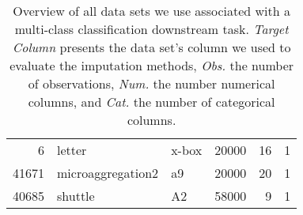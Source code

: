 \begin{table}[h!]
\begin{tabular}{rllrrr}
         6 &                                 letter &     x-box &   20000 &               16 &                1 \\
     41671 &                      microaggregation2 &    a9 &    20000 &               20 &                1 \\
     40685 &                                shuttle &     A2 &   58000 &                9 &                1 \\
\bottomrule
\end{tabular}
\caption{Overview of all data sets we use associated with a multi-class classification downstream task. \emph{Target Column} presents the data set's column we used to evaluate the imputation methods, \emph{Obs.} the number of observations, \emph{Num.} the number numerical columns, and \emph{Cat.} the number of categorical columns.}
\label{tab:multiclass_data}
\end{table}
